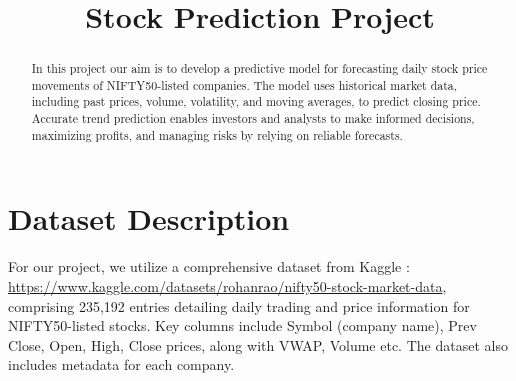 \documentclass[conference]{IEEEtran}
\begin{document}
\title{Stock Prediction Project}

\author{
}
\vspace{-0.3cm}
\maketitle

\begin{abstract}
    In this project our aim is to develop a predictive model for forecasting daily stock price movements of NIFTY50-listed companies. The model uses historical market data, including past prices, volume, volatility, and moving averages, to predict closing price. Accurate trend prediction enables investors and analysts to make informed decisions, maximizing profits, and managing risks by relying on reliable forecasts.
\end{abstract}

\section{Dataset Description}
For our project, we utilize a comprehensive dataset from Kaggle : \url{https://www.kaggle.com/datasets/rohanrao/nifty50-stock-market-data}, comprising 235,192 entries detailing daily trading and price information for NIFTY50-listed stocks. Key columns include Symbol (company name), Prev Close, Open, High, Close prices, along with VWAP, Volume etc. The dataset also includes metadata for each company.
\end{document}
